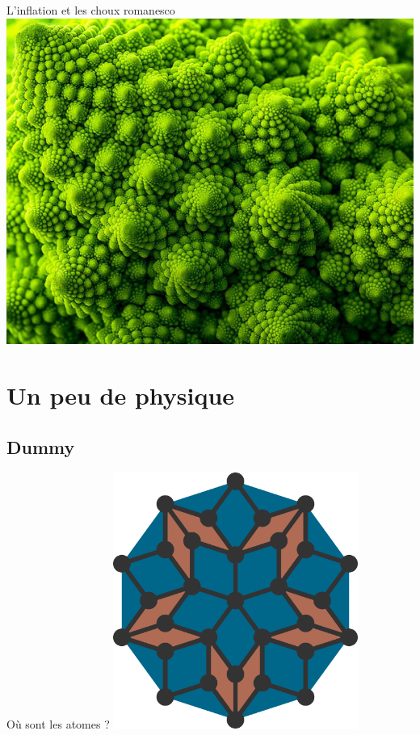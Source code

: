 \documentclass[xcolor=x11names,compress,professionalfonts]{beamer}
\renewcommand{\(}{\begin{columns}}
\renewcommand{\)}{\end{columns}}
\newcommand{\<}[1]{\begin{column}{#1}}
\renewcommand{\>}{\end{column}}
\begin{document}
\begin{frame}{L'inflation et les choux romanesco}
\centering
\includegraphics[width=.8\textwidth]{img/chou_romanesco.jpg}
\end{frame}

\section{Un peu de physique}
\subsection{Dummy}
\begin{frame}{Où sont les atomes ?}
\centering
\includegraphics[width=0.6\textwidth]{img/wheel_P3_2_atoms.pdf}
\end{frame}
\end{document}
